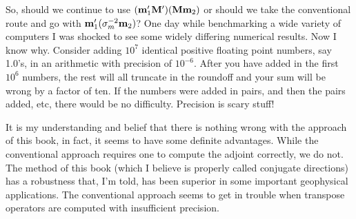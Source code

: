 \par
So, should we continue to use
$(\bold m'_1 \bold M') (\bold M \bold m_2)$
or should we take the conventional route and go with
$\bold m'_1 (\bold\sigma_m^{-2} \bold m_2)$?
One day while benchmarking a wide variety of computers I was shocked
to see some widely differing numerical results.  Now I know why.
Consider adding $10^7$ identical positive floating point numbers, say 1.0's,
in an arithmetic with precision of $10^{-6}$.
After you have added in the first $10^6$ numbers,
the rest will all truncate in the roundoff
and your sum will be wrong by a factor of ten.
If the numbers were added in pairs,
and then the pairs added, etc, there would be no difficulty.
Precision is scary stuff!

\par
It is my understanding and belief that there is nothing wrong
with the approach of this book, in fact,
it seems to have some definite advantages.
While the conventional approach requires one
to compute the adjoint correctly, we do not.
The method of this book
(which I believe is properly called conjugate directions)
has a robustness that, I'm told,
has been superior in some important geophysical applications.
The conventional approach seems to get in trouble when
transpose operators are computed with insufficient precision.







\unboldmath
%
%





\clearpage
